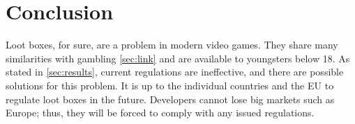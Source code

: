\documentclass[10pt,oneside,english,a4paper]{article}
\begin{document}
\section{Conclusion} \label{sec:conclusion} %

	Loot boxes, for sure, are a problem in modern video games. They share many similarities with gambling \ref{sec:link} and are available to youngsters below 18. As stated in \ref{sec:results}, current regulations are ineffective, and there are possible solutions for this problem. It is up to the individual countries and the EU to regulate loot boxes in the future. Developers cannot lose big markets such as Europe; thus, they will be forced to comply with any issued regulations.





\end{document}
